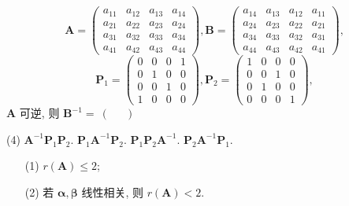 \[ \bm{A} = \begin{pmatrix} a_{11} & a_{12} & a_{13} & a_{14} \\ a_{21} & a_{22} & a_{23} & a_{24} \\ a_{31} & a_{32} & a_{33} & a_{34} \\ a_{41} & a_{42} & a_{43} & a_{44} \end{pmatrix}, \bm{B} = \begin{pmatrix} a_{14} & a_{13} & a_{12} & a_{11} \\ a_{24} & a_{23} & a_{22} & a_{21} \\ a_{34} & a_{33} & a_{32} & a_{31} \\ a_{44} & a_{43} & a_{42} & a_{41} \end{pmatrix}, \]
\[ \bm{P}_1 = \begin{pmatrix} 0 & 0 & 0 & 1 \\ 0 & 1 & 0 & 0 \\ 0 & 0 & 1 & 0 \\ 1 & 0 & 0 & 0 \end{pmatrix}, \bm{P}_2 = \begin{pmatrix} 1 & 0 & 0 & 0 \\ 0 & 0 & 1 & 0 \\ 0 & 1 & 0 & 0 \\ 0 & 0 & 0 & 1 \end{pmatrix}, \]
$\displaystyle \bm{A}$ 可逆, 则 $\displaystyle \bm{B}^{-1} =~(~\quad~)$
\begin{tasks}(4)
  \task $\displaystyle \bm{A}^{-1}\bm{P}_1\bm{P}_2.$
  \task $\displaystyle \bm{P}_1\bm{A}^{-1}\bm{P}_2.$
  \task $\displaystyle \bm{P}_1\bm{P}_2\bm{A}^{-1}.$
  \task $\displaystyle \bm{P}_2\bm{A}^{-1}\bm{P}_1.$
\end{tasks}

\begin{enumerate}
\item[(1)] $\displaystyle r(\bm{A}) \le 2$;
\item[(2)] 若 $\displaystyle \boldsymbol{\alpha}, \boldsymbol{\beta}$ 线性相关, 则 $\displaystyle r(\bm{A}) < 2$.
\end{enumerate}
